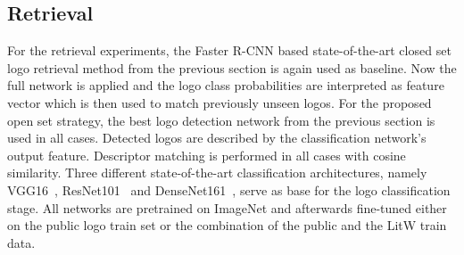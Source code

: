 \documentclass[a4paper,twoside]{article}
\begin{document}
\subsection{Retrieval}
%
For the retrieval experiments, the Faster R-CNN based state-of-the-art closed set logo retrieval method from the previous section is again used as baseline. Now the full network is applied and the logo class probabilities are interpreted as feature vector which is then used to match previously unseen logos.
For the proposed open set strategy, the best logo detection network from the previous section is used in all cases. Detected logos are described by the classification network's output feature. Descriptor matching is performed in all cases with cosine similarity. Three different state-of-the-art classification architectures, namely VGG16~\cite{simonyan2014}, ResNet101~\cite{he2015} and DenseNet161~\cite{huang2016}, serve as base for the logo classification stage. All networks are pretrained on ImageNet and afterwards fine-tuned either on the public logo train set or the combination of the public and the \ac{LitW} train data.
\end{document}

